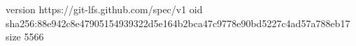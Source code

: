 version https://git-lfs.github.com/spec/v1
oid sha256:88e942c8e47905154939322d5e164b2bca47c9778e90bd5227c4ad57a788eb17
size 5566
